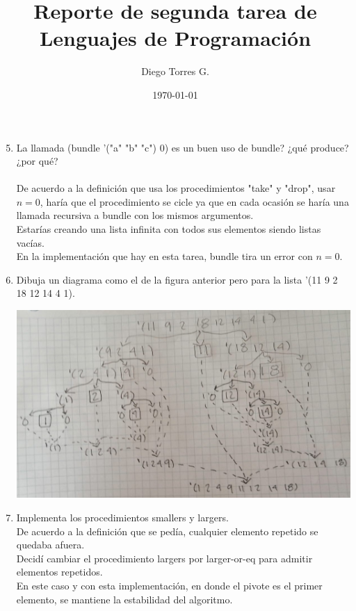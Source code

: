 \documentclass[12pt]{article}
\begin{document}
\title{Reporte de segunda tarea de Lenguajes de Programaci\'on}
\author{Diego Torres G.}
\date{\today}

\maketitle

\begin{enumerate}
\setcounter{enumi}{4}

		\item{La llamada (bundle '("a" "b" "c") 0) es un buen uso de bundle? ¿qu\'e produce? ¿por qu\'e?}\\\\
				De acuerdo a la definici\'on que usa los procedimientos "take" y "drop", usar $n = 0$, har\'ia que el procedimiento se cicle ya que en cada ocasi\'on se
				har\'ia una llamada recursiva a bundle con los mismos argumentos.\\

				Estar\'ias creando una lista infinita con todos sus elementos siendo listas vac\'ias.\\

				En la implementaci\'on que hay en esta tarea, bundle tira un error con $n = 0$.\\
\setcounter{enumi}{8}
\pagebreak

		\item{Dibuja un diagrama como el de la figura anterior pero para la lista '(11 9 2 18 12 14 4 1).}
				\begin{center}
						\includegraphics[scale=0.35]{quicksort_diagram.jpeg}
				\end{center}

\setcounter{enumi}{9}

		\item{Implementa los procedimientos smallers y largers.}\\
				De acuerdo a la definici\'on que se ped\'ia, cualquier elemento repetido se quedaba afuera.\\ Decid\'i cambiar el procedimiento largers por 
				larger-or-eq para admitir elementos repetidos.\\ En este caso y con esta implementación, en donde el pivote es el primer elemento, se mantiene la 
				estabilidad del algoritmo.


\end{enumerate}
\end{document}
